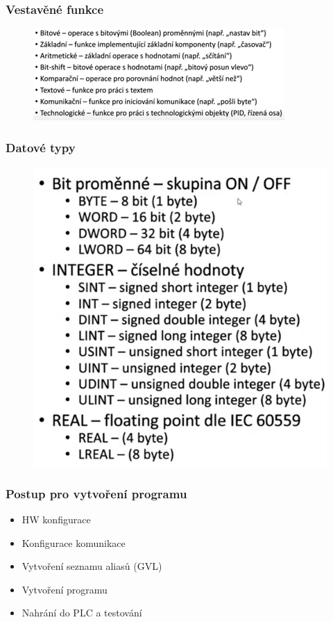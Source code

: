 \subsubsection*{Vestavěné funkce}
\begin{figure}[h] 
  \includegraphics[scale = 0.85]{img/Picture15.png}
\end{figure}

\subsubsection*{Datové typy}
\begin{figure}[!h]
  \includegraphics[scale = 0.85]{img/Picture16.png}
\end{figure}

\subsubsection*{Postup pro vytvoření programu}
\begin{itemize}
  \item HW konfigurace 
  \item Konfigurace komunikace
  \item Vytvoření seznamu aliasů (GVL)
  \item Vytvoření programu
  \item Nahrání do PLC a testování
\end{itemize}

